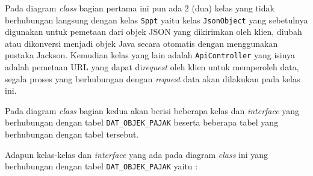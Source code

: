 \documentclass[pdftex,12pt, oneside]{article}
\begin{document}
Pada diagram \textit{class} bagian pertama ini pun ada 2 (dua) kelas yang tidak berhubungan langsung dengan kelas \texttt{Sppt} yaitu kelas \texttt{JsonObject} yang sebetulnya digunakan untuk pemetaan dari objek JSON yang dikirimkan oleh klien, diubah atau dikonversi menjadi objek Java secara otomatis dengan menggunakan pustaka Jackson. Kemudian kelas yang lain adalah \texttt{ApiController} yang isinya adalah pemetaan URL yang dapat di\textit{request} oleh klien untuk memperoleh data, segala proses yang berhubungan dengan \textit{request} data akan dilakukan pada kelas ini.

Pada diagram \textit{class} bagian kedua akan berisi beberapa kelas dan \textit{interface} yang berhubungan dengan tabel \texttt{DAT\_OBJEK\_PAJAK} beserta beberapa tabel yang berhubungan dengan tabel tersebut.

Adapun kelas-kelas dan \textit{interface} yang ada pada diagram \textit{class} ini yang berhubungan dengan tabel \texttt{DAT\_OBJEK\_PAJAK} yaitu :
\end{document}
